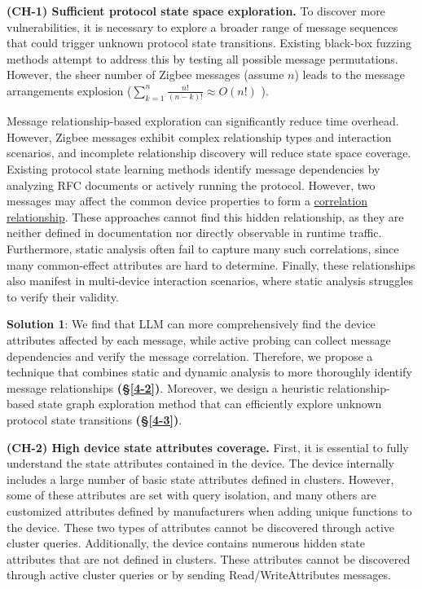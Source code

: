\documentclass[10pt,journal,compsoc]{IEEEtran}
\begin{document}
\textbf{(CH-1) Sufficient protocol state space exploration.} To discover more vulnerabilities, it is necessary to explore a broader range of message sequences that could trigger unknown protocol state transitions. Existing black-box fuzzing methods \cite{gascon2015pulsar, chen2019exploring} attempt to address this by testing all possible message permutations. However, the sheer number of Zigbee messages (assume $n$) leads to the message arrangements explosion ($\sum_{k=1}^{n}\frac{n!}{(n-k)!}\approx O(n!)$ ). \vspace{0.1cm}

Message relationship-based exploration can significantly reduce time overhead. However, Zigbee messages exhibit complex relationship types and interaction scenarios, and incomplete relationship discovery will reduce state space coverage. Existing protocol state learning methods \cite{daniel2018inferring, de2015protocol, fiterau2020analysis} identify message dependencies by analyzing RFC documents or actively running the protocol. However, two messages may affect the common device properties to form a \underline{correlation relationship}. These approaches cannot find this hidden relationship, as they are neither defined in documentation nor directly observable in runtime traffic. Furthermore, static analysis often fail to capture many such correlations, since many common-effect attributes are hard to determine. Finally, these relationships also manifest in multi-device interaction scenarios, where static analysis struggles to verify their validity. \vspace{0.1cm}

\noindent \checkmark \; \textbf{Solution 1}: We find that LLM can more comprehensively find the device attributes affected by each message, while active probing can collect message dependencies and verify the message correlation. Therefore, we propose a technique that combines static and dynamic analysis to more thoroughly identify message relationships \textbf{(\S\ref{4-2})}. Moreover, we design a heuristic relationship-based state graph exploration method that can efficiently explore unknown protocol state transitions \textbf{(\S\ref{4-3})}. \\ \vspace{-0.2cm}

\noindent \textbf{(CH-2) High device state attributes coverage.} First, it is essential to fully understand the state attributes contained in the device. The device internally includes a large number of basic state attributes defined in clusters. However, some of these attributes are set with query isolation, and many others are customized attributes defined by manufacturers when adding unique functions to the device. These two types of attributes cannot be discovered through active cluster queries. Additionally, the device contains numerous hidden state attributes that are not defined in clusters. These attributes cannot be discovered through active cluster queries or by sending Read/WriteAttributes messages.\vspace{0.1cm}
\end{document}
